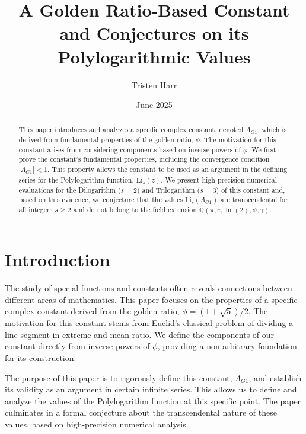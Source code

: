 \documentclass{amsart}
\theoremstyle{plain}
\theoremstyle{definition}
\theoremstyle{remark}
\newcommand{\LambdaG}{\Lambda_{G1}}
\begin{document}
\title[A Golden Ratio Constant and its Polylogarithmic Values]{A Golden Ratio-Based Constant and Conjectures on its Polylogarithmic Values}
\author{Tristen Harr}
\date{June 2025}

\begin{abstract}
This paper introduces and analyzes a specific complex constant, denoted $\LambdaG$, which is derived from fundamental properties of the golden ratio, $\phi$. The motivation for this constant arises from considering components based on inverse powers of $\phi$. We first prove the constant's fundamental properties, including the convergence condition $|\LambdaG| < 1$. This property allows the constant to be used as an argument in the defining series for the Polylogarithm function, $\mathrm{Li}_s(z)$. We present high-precision numerical evaluations for the Dilogarithm ($s=2$) and Trilogarithm ($s=3$) of this constant and, based on this evidence, we conjecture that the values $\mathrm{Li}_s(\LambdaG)$ are transcendental for all integers $s \ge 2$ and do not belong to the field extension $\mathbb{Q}(\pi, e, \ln(2), \phi, \gamma)$.
\end{abstract}

\maketitle

\section{Introduction}
The study of special functions and constants often reveals connections between different areas of mathematics. This paper focuses on the properties of a specific complex constant derived from the golden ratio, $\phi = (1+\sqrt{5})/2$. The motivation for this constant stems from Euclid's classical problem of dividing a line segment in extreme and mean ratio. We define the components of our constant directly from inverse powers of $\phi$, providing a non-arbitrary foundation for its construction.

The purpose of this paper is to rigorously define this constant, $\LambdaG$, and establish its validity as an argument in certain infinite series. This allows us to define and analyze the values of the Polylogarithm function at this specific point. The paper culminates in a formal conjecture about the transcendental nature of these values, based on high-precision numerical analysis.
\end{document}
